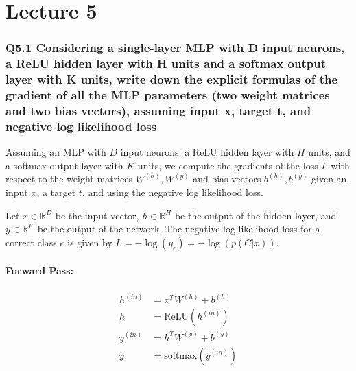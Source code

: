 \documentclass[11pt]{article}
\begin{document}
\part{Lecture 5}

\section{Q5.1 Considering a single-layer MLP with D input neurons, a ReLU hidden layer with H units and a softmax output layer with K units, write down the explicit formulas of the gradient of all the MLP parameters (two weight matrices and two bias vectors), assuming input x, target t, and negative log likelihood loss}

Assuming an MLP with \( D \) input neurons, a ReLU hidden layer with \( H \) units, and a softmax output layer with \( K \) units, we compute the gradients of the loss \( L \) with respect to the weight matrices \( W^{(h)}, W^{(y)} \) and bias vectors \( b^{(h)}, b^{(y)} \) given an input \( x \), a target \( t \), and using the negative log likelihood loss.

Let \( x \in \mathbb{R}^D \) be the input vector, \( h \in \mathbb{R}^H \) be the output of the hidden layer, and \( y \in \mathbb{R}^K \) be the output of the network. The negative log likelihood loss for a correct class \( c \) is given by \( L = -\log(y_c) = -\log(p(C | x))\).

\subsection*{Forward Pass:}
\begin{align*}
h^{(in)} &= x^T W^{(h)} + b^{(h)} \\
h &= \text{ReLU}(h^{(in)}) \\
y^{(in)} &= h^T W^{(y)} + b^{(y)} \\
y &= \text{softmax}(y^{(in)})
\end{align*}
\end{document}
